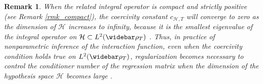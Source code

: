 \documentclass[]{elsarticle}
\def\E{\mathbb{E}}
\newcommand{\wbar}\widebar
\newcommand{\mbf}[1]{\boldsymbol{#1}}
\newcommand{\bX}{\mbf{X}}
\newcommand{\hypspace}{\mathcal{H}}
\newtheorem{remark}[theorem]{Remark}
\numberwithin{equation}{section}
\numberwithin{theorem}{section}
\begin{document}



\begin{remark}\label{rmk:compactOpterator}
When the related integral operator is compact and strictly positive (see Remark \ref{rmk_compact}), the coercivity constant  $c_{\mathcal{H},T}$ will converge to zero as the dimension of $\hypspace$ increases to infinity, because it is the smallest eigenvalue of the integral operator on  $\hypspace \subset L^2(\wbar\rho_T)$ . Thus,  in practice of nonparametric inference of the interaction function, even when the coercivity condition holds true on $L^2(\wbar\rho_T)$, regularization becomes necessary to control the conditioner number of the regression matrix when the dimension of the hypothesis space $\hypspace$ becomes large \cite{LZTM19,LMT19,LMT20}. 
\end{remark}
\end{document}
